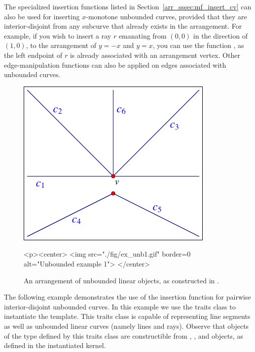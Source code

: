 The specialized insertion functions listed in
Section~\ref{arr_sssec:mf_insert_cv} can also be used for inserting
$x$-monotone unbounded curves, provided that they are interior-disjoint
from any subcurve that already exists in the arrangement. For example,
if you wish to insert a ray $r$ emanating from $(0,0)$ in the direction
of $(1,0)$, to the arrangement of $y = -x$ and $y = x$, you can use
the function , as the left
endpoint of $r$ is already associated with an arrangement vertex.
Other edge-manipulation functions can also be applied on edges
associated with unbounded curves.

\begin{figure}[t]
\begin{ccTexOnly}
  \begin{center}
  \includegraphics{Arrangement_2/fig/ex_unb1}
  \end{center}
\end{ccTexOnly}
\begin{ccHtmlOnly}
  <p><center>
  <img src="./fig/ex_unb1.gif" border=0 alt="Unbounded example 1">
  </center>
\end{ccHtmlOnly}
\caption{An arrangement of unbounded linear objects, as constructed
in .\label{arr_fig:ex_unb1}}
\end{figure}

The following example demonstrates the use of the insertion function
for pairwise interior-disjoint unbounded curves. In this example
we use the traits class  to
instantiate the  template. This traits class is
capable of representing line segments as well as unbounded linear
curves (namely lines and rays). Observe that objects of the type
 defined by this traits class are
constructible from , , and 
objects, as defined in the instantiated kernel.

